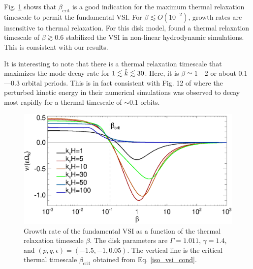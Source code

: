 Fig. \ref{bcrit_compare1} shows that 
$\beta_\mathrm{crit}$ is a good indication for the maximum
thermal relaxation timescale to permit the fundamental VSI. For
$\beta\lesssim O(10^{-2})$, growth rates are insensitive to thermal
relaxation. For this disk model, \citeauthor{nelson13}
found a thermal relaxation timescale of $\beta\gtrsim 0.6$ stabilized
the VSI in non-linear hydrodynamic simulations. This is consistent
with our results.   

It is interesting to note that there is a thermal relaxation timescale that
maximizes the mode decay rate for $1\lesssim \hat{k} \lesssim 30$. Here,
it is $\beta\simeq1$---$2$ or about $0.1$---$0.3$ orbital
periods. This is in fact consistent with Fig. 12 of \cite{nelson13}
where the perturbed kinetic energy in their numerical simulations was
observed to decay most rapidly for a thermal timescale of $\sim 0.1$
orbits.     


 \begin{figure}
   \includegraphics[width=\linewidth]{figures/gcorr_compare2} 
   \caption{Growth rate of the fundamental VSI as
     a function of the thermal relaxation timescale $\beta$. The disk
     parameters are $\Gamma=1.011$, $\gamma=1.4$, and 
     $(p,q,\epsilon)=(-1.5,-1,0.05)$. The vertical line
     is the critical thermal timescale $\beta_\mathrm{crit}$  obtained
     from Eq. \ref{iso_vsi_cond}. 
     \label{bcrit_compare1}}   
 \end{figure} 



